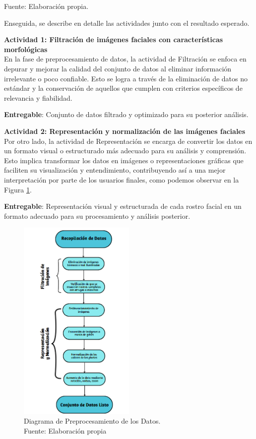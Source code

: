 \begin{flushleft}
	\small Fuente: Elaboración propia.
\end{flushleft}

Enseguida, se describe en detalle las actividades junto con el resultado esperado.

\textbf{Actividad 1: Filtración de imágenes faciales con características morfológicas}
\\
En la fase de preprocesamiento de datos, la actividad de Filtración se enfoca en depurar y mejorar la calidad del conjunto de datos al eliminar información irrelevante o poco confiable. Esto se logra a través de la eliminación de datos no estándar y la conservación de aquellos que cumplen con criterios específicos de relevancia y fiabilidad. 

\textbf{Entregable}: Conjunto de datos filtrado y optimizado para su posterior análisis.

\textbf{Actividad 2: Representación y normalización de las imágenes faciales}
\\
Por otro lado, la actividad de Representación se encarga de convertir los datos en un formato visual o estructurado más adecuado para su análisis y comprensión. Esto implica transformar los datos en imágenes o representaciones gráficas que faciliten su visualización y entendimiento, contribuyendo así a una mejor interpretación por parte de los usuarios finales, como podemos observar en la Figura \ref{3:fig4}.

\textbf{Entregable}: Representación visual y estructurada de cada rostro facial en un formato adecuado para su procesamiento y análisis posterior.

\begin{figure}[h]
     \begin{center}
         \includegraphics[width=0.5\textwidth]{3/figures/Diagrama de preprocesamiento.png}
         \caption[Diagrama de Preprocesamiento de los Datos]{Diagrama de Preprocesamiento de los Datos.\\
         Fuente: Elaboración propia}
         \label{3:fig4}
     \end{center}
 \end{figure}



